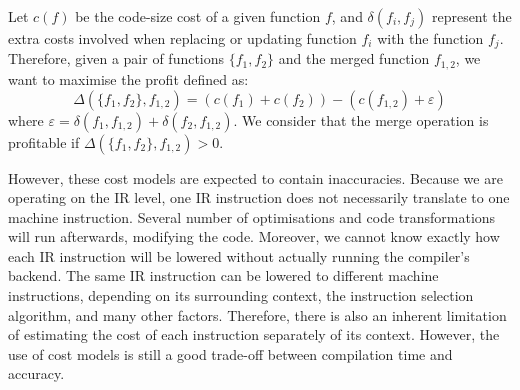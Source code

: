 Let $c(f)$ be the code-size cost of a given function $f$, and
$\delta(f_i, f_j)$ represent the extra costs involved when replacing or
updating function $f_i$ with the function $f_j$.
Therefore, given a pair of functions $\{f_1,f_2\}$ and the merged function
$f_{1,2}$, we want to maximise the profit defined as:
\[
  \Delta(\{f_1,f_2\},f_{1,2}) = (c(f_1)+c(f_2)) - (c(f_{1,2}) + \varepsilon)
\]
where $\varepsilon = \delta(f_1, f_{1,2}) + \delta(f_2, f_{1,2})$.
We consider that the merge operation is profitable if $\Delta(\{f_1,f_2\},f_{1,2})>0$.

However, these cost models are expected to contain inaccuracies.
Because we are operating on the IR level, one IR instruction does not necessarily translate to one machine instruction.
Several number of optimisations and code transformations will run afterwards, modifying the code.
Moreover, we cannot know exactly how each IR instruction will be lowered without actually running the compiler's backend.
The same IR instruction can be lowered to different machine instructions, depending on its surrounding context, the instruction selection algorithm, and many other factors.
Therefore, there is also an inherent limitation of estimating the cost of each instruction separately of its context.
However, the use of cost models is still a good trade-off between compilation time and accuracy.


